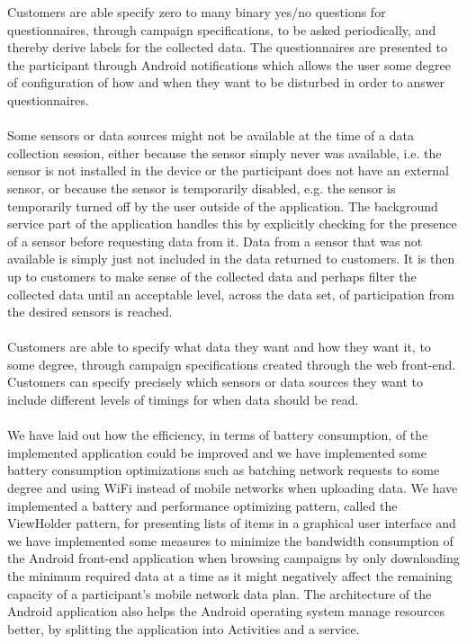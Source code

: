 Customers are able specify zero to many binary yes/no questions for questionnaires, through campaign specifications, to be asked periodically, and thereby derive labels for the collected data. The questionnaires are presented to the participant through Android notifications which allows the user some degree of configuration of how and when they want to be disturbed in order to answer questionnaires. 
\\\\
Some sensors or data sources might not be available at the time of a data collection session, either because the sensor simply never was available, i.e. the sensor is not installed in the device or the participant does not have an external sensor, or because the sensor is temporarily disabled, e.g. the sensor is temporarily turned off by the user outside of the application. The background service part of the application handles this by explicitly checking for the presence of a sensor before requesting data from it. Data from a sensor that was not available is simply just not included in the data returned to customers. It is then up to customers to make sense of the collected data and perhaps filter the collected data until an acceptable level, across the data set, of participation from the desired sensors is reached.
\\\\
Customers are able to specify what data they want and how they want it, to some degree, through campaign specifications created through the web front-end. Customers can specify precisely which sensors or data sources they want to include different levels of timings for when data should be read. 
\\\\
We have laid out how the efficiency, in terms of battery consumption, of the implemented application could be improved and we have implemented some battery consumption optimizations such as batching network requests to some degree and using WiFi instead of mobile networks when uploading data. We have implemented a battery and performance optimizing pattern, called the ViewHolder pattern, for presenting lists of items in a graphical user interface  and we have implemented some measures to minimize the bandwidth consumption of the Android front-end application when browsing campaigns by only downloading the minimum required data at a time as it might negatively affect the remaining capacity of a participant's mobile network data plan. The architecture of the Android application also helps the Android operating system manage resources better, by splitting the application into Activities and a service. \\
